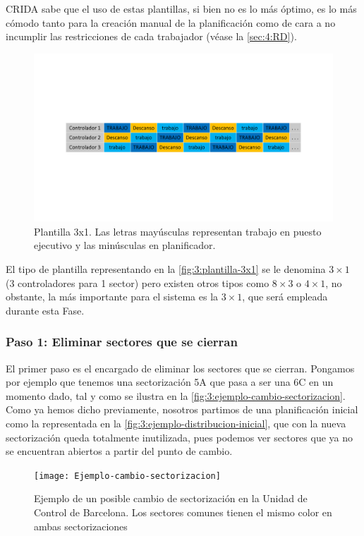 \gls{CRIDA} sabe que el uso de estas plantillas, si bien no es lo más óptimo, es lo más cómodo tanto para la creación manual de la planificación como de cara a no incumplir las restricciones de cada trabajador (véase la  \autoref{sec:4:RD}).

\begin{figure}
	\centering
	\includegraphics[width=0.9\linewidth]{capitulos/Capitulo3-Metodologia-propuesta/recursos/Plantilla-3x1}
	\caption[Plantilla 3x1]{Plantilla 3x1. Las letras mayúsculas representan trabajo en 
		puesto ejecutivo y las minúsculas en planificador.}
	\label{fig:3:plantilla-3x1}
\end{figure}

El tipo de plantilla representando en la \autoref{fig:3:plantilla-3x1} se le denomina $3\times1$ (3 controladores para 1 sector) pero existen otros tipos como $8\times3$ o $4\times1$, no obstante, la más importante para el sistema es la $3\times1$, que será empleada durante esta Fase.

\subsubsection{Paso 1: Eliminar sectores que se cierran}
\label{sec:3:fase1-paso1}
El primer paso es el encargado de eliminar los sectores que se cierran. Pongamos por ejemplo que tenemos una 
sectorización 5A que pasa a ser una 6C en un momento dado, tal y como se ilustra en la 
\autoref{fig:3:ejemplo-cambio-sectorizacion}. Como ya hemos dicho previamente, nosotros partimos de una planificación inicial como la representada en la \autoref{fig:3:ejemplo-distribucion-inicial}, que con la nueva sectorización queda totalmente inutilizada, pues podemos ver sectores que ya no se encuentran abiertos a partir del punto de cambio.

\begin{figure}[htbp]
	\centering
	\texttt{[image: Ejemplo-cambio-sectorizacion]}
	\caption[Ejemplo de cambio de sectorización]{Ejemplo de un posible cambio de sectorización en la Unidad de Control 
	de Barcelona. Los sectores comunes tienen el mismo color en ambas sectorizaciones}
	\label{fig:3:ejemplo-cambio-sectorizacion}
\end{figure}


